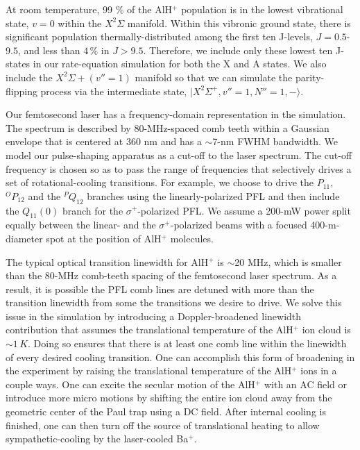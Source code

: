 \documentclass[nofootinbib,aip,jcp,reprint]{revtex4-1}
\begin{document}
At room temperature, 99 $\%$ of the AlH$^+$ population is in the lowest vibrational state, $v=0$ within the $X^2 \Sigma$ manifold. Within this vibronic ground state, there is significant population thermally-distributed among the first ten J-levels, $J=0.5$-$9.5$, and less than $4\, \%$ in $J>9.5$. Therefore, we include only these lowest ten J-states in our rate-equation simulation for both the X and A states. We also include the $X^2\Sigma+ (v''=1)$ manifold so that we can simulate the parity-flipping process via the intermediate state, $\lvert X^2\Sigma^+, v''=1, N''=1, -\rangle$.

Our femtosecond laser has a frequency-domain representation in the simulation. The spectrum is described by 80-MHz-spaced comb teeth within a Gaussian envelope that is centered at 360 nm and has a $\sim$7-nm FWHM bandwidth. We model our pulse-shaping apparatus as a cut-off to the laser spectrum. The cut-off frequency is chosen so as to pass the range of frequencies that selectively drives a set of rotational-cooling transitions. For example, we choose to drive the $P_{11}$, $^OP_{12}$ and the $^PQ_{12}$ branches using the linearly-polarized PFL and then include the $Q_{11}(0)$ branch for the $\sigma^+$-polarized PFL. We assume a 200-mW power split equally between the linear- and the $\sigma^+$-polarized beams with a focused 400-{\micro}m-diameter spot at the position of AlH$^+$ molecules.

The typical optical transition linewidth for AlH$^+$ is $\sim$20 MHz, which is smaller than the 80-MHz comb-teeth spacing of the femtosecond laser spectrum. As a result, it is possible the PFL comb lines are detuned with more than the transition linewidth from some the transitions we desire to drive. We solve this issue in the simulation by introducing a Doppler-broadened linewidth contribution that assumes the translational temperature of the AlH$^+$ ion cloud is $\sim 1\, K$. Doing so ensures that there is at least one comb line within the linewidth of every desired cooling transition. One can accomplish this form of broadening in the experiment by raising the translational temperature of the AlH$^+$ ions in a couple ways. One can excite the secular motion of the AlH$^+$ with an AC field or introduce more micro motions by shifting the entire ion cloud away from the geometric center of the Paul trap using a DC field. After internal cooling is finished, one can then turn off the source of translational heating to allow sympathetic-cooling by the laser-cooled Ba$^+$.
\end{document}
